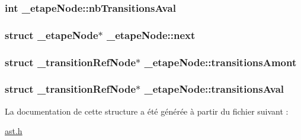 \hypertarget{struct__etapeNode_ad66d5f8cf9aa988a9f4e93ba54ace1aa}{
\subsubsection[{nb\-Transitions\-Aval}]{\setlength{\rightskip}{0pt plus 5cm}int \-\_\-etape\-Node\-::nb\-Transitions\-Aval}}\label{struct__etapeNode_ad66d5f8cf9aa988a9f4e93ba54ace1aa}
\hypertarget{struct__etapeNode_a73067713dc0dbd54c48499c76e75ad5f}{
\subsubsection[{next}]{\setlength{\rightskip}{0pt plus 5cm}struct {\bf \-\_\-etape\-Node}$\ast$ \-\_\-etape\-Node\-::next}}\label{struct__etapeNode_a73067713dc0dbd54c48499c76e75ad5f}
\hypertarget{struct__etapeNode_a09d6998355aa6ba3e9d48b1160b2d40e}{
\subsubsection[{transitions\-Amont}]{\setlength{\rightskip}{0pt plus 5cm}struct {\bf \-\_\-transition\-Ref\-Node}$\ast$ \-\_\-etape\-Node\-::transitions\-Amont}}\label{struct__etapeNode_a09d6998355aa6ba3e9d48b1160b2d40e}
\hypertarget{struct__etapeNode_a0d8711116aefef2182d1cb840317fcff}{
\subsubsection[{transitions\-Aval}]{\setlength{\rightskip}{0pt plus 5cm}struct {\bf \-\_\-transition\-Ref\-Node}$\ast$ \-\_\-etape\-Node\-::transitions\-Aval}}\label{struct__etapeNode_a0d8711116aefef2182d1cb840317fcff}


La documentation de cette structure a été générée à partir du fichier suivant \-:\begin{DoxyCompactItemize}
\item 
\hyperlink{ast_8h}{ast.\-h}\end{DoxyCompactItemize}
